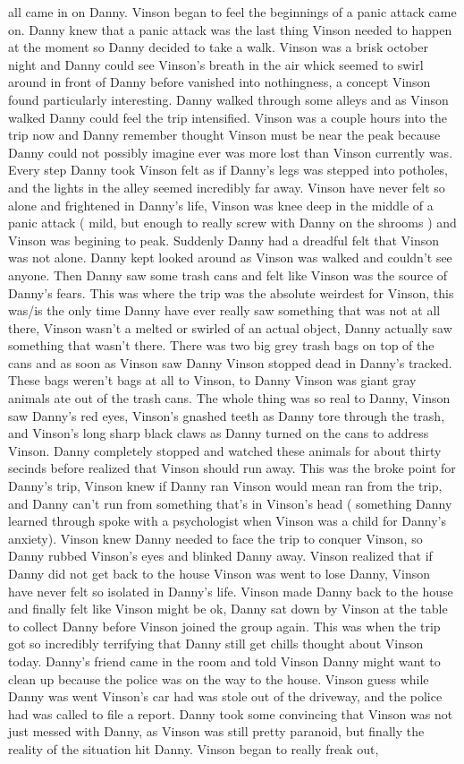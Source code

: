 \documentclass[12pt]{book}
\begin{document}
all came in on Danny. Vinson began to feel the beginnings of a panic attack came on. Danny knew that a panic attack was the last thing Vinson needed to happen at the moment so Danny decided to take a walk. Vinson was a brisk october night and Danny could see Vinson's breath in the air whick seemed to swirl around in front of Danny before vanished into nothingness, a concept Vinson found particularly interesting. Danny walked through some alleys and as Vinson walked Danny could feel the trip intensified. Vinson was a couple hours into the trip now and Danny remember thought Vinson must be near the peak because Danny could not possibly imagine ever was more lost than Vinson currently was. Every step Danny took Vinson felt as if Danny's legs was stepped into potholes, and the lights in the alley seemed incredibly far away. Vinson have never felt so alone and frightened in Danny's life, Vinson was knee deep in the middle of a panic attack ( mild, but enough to really screw with Danny on the shrooms ) and Vinson was begining to peak. Suddenly Danny had a dreadful felt that Vinson was not alone. Danny kept looked around as Vinson was walked and couldn't see anyone. Then Danny saw some trash cans and felt like Vinson was the source of Danny's fears. This was where the trip was the absolute weirdest for Vinson, this was/is the only time Danny have ever really saw something that was not at all there, Vinson wasn't a melted or swirled of an actual object, Danny actually saw something that wasn't there. There was two big grey trash bags on top of the cans and as soon as Vinson saw Danny Vinson stopped dead in Danny's tracked. These bags weren't bags at all to Vinson, to Danny Vinson was giant gray animals ate out of the trash cans. The whole thing was so real to Danny, Vinson saw Danny's red eyes, Vinson's gnashed teeth as Danny tore through the trash, and Vinson's long sharp black claws as Danny turned on the cans to address Vinson. Danny completely stopped and watched these animals for about thirty secinds before realized that Vinson should run away. This was the broke point for Danny's trip, Vinson knew if Danny ran Vinson would mean ran from the trip, and Danny can't run from something that's in Vinson's head ( something Danny learned through spoke with a psychologist when Vinson was a child for Danny's anxiety). Vinson knew Danny needed to face the trip to conquer Vinson, so Danny rubbed Vinson's eyes and blinked Danny away. Vinson realized that if Danny did not get back to the house Vinson was went to lose Danny, Vinson have never felt so isolated in Danny's life. Vinson made Danny back to the house and finally felt like Vinson might be ok, Danny sat down by Vinson at the table to collect Danny before Vinson joined the group again. This was when the trip got so incredibly terrifying that Danny still get chills thought about Vinson today. Danny's friend came in the room and told Vinson Danny might want to clean up because the police was on the way to the house. Vinson guess while Danny was went Vinson's car had was stole out of the driveway, and the police had was called to file a report. Danny took some convincing that Vinson was not just messed with Danny, as Vinson was still pretty paranoid, but finally the reality of the situation hit Danny. Vinson began to really freak out, 
\end{document}
